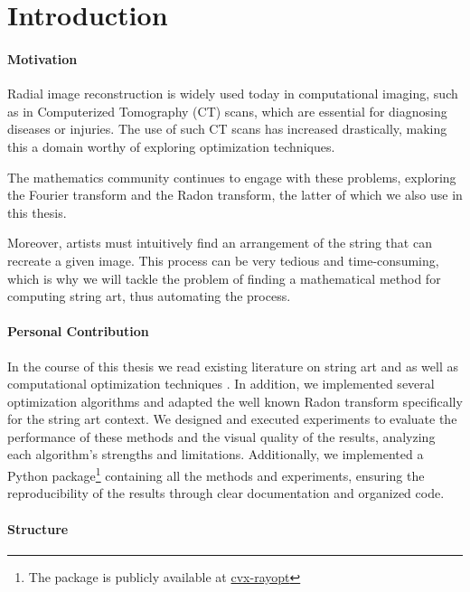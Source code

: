 \chapter{Introduction}

\subsubsection{Motivation}
 
Radial image reconstruction is widely used today in computational imaging, such as in Computerized Tomography (CT) scans, which are essential for diagnosing diseases or injuries. The use of such CT scans has increased drastically, making this a domain worthy of exploring optimization techniques.

The mathematics community continues to engage with these problems, exploring the Fourier transform and the Radon transform, the latter of which we also use in this thesis.

Moreover, artists must intuitively find an arrangement of the string that can recreate a given image. This process can be very tedious and time-consuming, which is why we will tackle the problem of finding a mathematical method for computing string art, thus automating the process.

\subsubsection{Personal Contribution}

In the course of this thesis we read existing literature on string art \cite{towards-computational-stringart} and \cite{computational-stringart} as well as computational optimization techniques \cite{convex-optimization}. In addition, we implemented several optimization algorithms and adapted the well known Radon transform specifically for the string art context. We designed and executed experiments to evaluate the performance of these methods and the visual quality of the results, analyzing each algorithm's strengths and limitations. Additionally, we implemented a Python package\footnote{The package is publicly available at \href{https://github.com/skpha13/cvx-rayopt}{cvx-rayopt}} containing all the methods and experiments, ensuring the reproducibility of the results through clear documentation and organized code.

\subsubsection{Structure}

